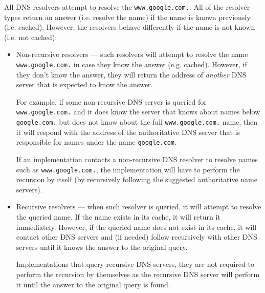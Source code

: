 \documentclass[pdftex,12pt,a4paper]{article}
\begin{document}
            All DNS resolvers attempt to resolve the \texttt{www.google.com.}.
            All of the resolver types return an answer (i.e. resolve the name)
            if the name is known previously (i.e. cached). However, the
            resolvers behave differently if the name is not known (i.e. not
            cached):
            \begin{itemize}
                \item Non-recursive resolvers --- such resolvers will attempt to
                    resolve the name \texttt{www.google.com.} in case they know the
                    answer (e.g. cached). However, if they don't know the
                    answer, they will return the address of \emph{another} DNS
                    server that is expected to know the answer.

                    For example, if some non-recursive DNS server is queried for
                    \texttt{www.google.com.} and it does know the server that
                    knows about names below \texttt{google.com.} but does not
                    know about the full \texttt{www.google.com.} name, then it
                    will respond with the address of the authoritative DNS
                    server that is responsible for names under the name
                    \texttt{google.com}.

                    If an implementation contacts a non-recursive DNS resolver
                    to resolve names such as \texttt{www.google.com.}, the
                    implementation will have to perform the recursion by itself
                    (by recursively following the suggested authoritative name
                    servers).

                \item Recursive resolvers --- when such resolver is
                    queried, it will attempt to resolve the queried name. If
                    the name exists in its cache, it will return it
                    immediately. However, if the queried name does not exist in
                    its cache, it will contact other DNS servers and (if
                    needed) follow recursively with other DNS servers until it
                    knows the answer to the original query.

                    Implementations that query recursive DNS servers, they are
                    not required to perform the recursion by themselves as the
                    recursive DNS server will perform it until the answer to
                    the original query is found.
            \end{itemize}
\end{document}
